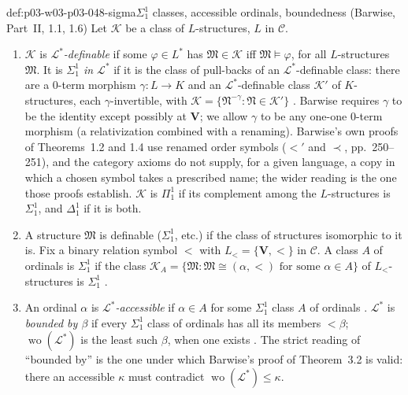 \begin{hbdefinition}{def:p03-w03-p03-048-sigma}{\(\Sigma^1_1\) classes, accessible ordinals, boundedness (Barwise, Part~II, 1.1, 1.6)}
Let \(\mathcal K\) be a class of \(L\)-structures, \(L\) in \(\mathcal C\).
\begin{enumerate}
\item \(\mathcal K\) is \emph{\(\mathcal L^{\ast}\)-definable} if some
      \(\varphi\in L^{\ast}\) has \(\mathfrak M\in\mathcal K\) iff
      \(\mathfrak M\models\varphi\), for all \(L\)-structures \(\mathfrak M\).
      It is \emph{\(\Sigma^1_1\) in \(\mathcal L^{\ast}\)} if it is the class
      of pull-backs of an \(\mathcal L^{\ast}\)-definable class: there are a
      \(0\)-term morphism \(\gamma:L\to K\) and an
      \(\mathcal L^{\ast}\)-definable class \(\mathcal K'\) of
      \(K\)-structures, each \(\gamma\)-invertible, with
      \(\mathcal K=\{\mathfrak N^{-\gamma}:\mathfrak N\in\mathcal K'\}\)
      \cite[Part~II, \S1, 1.1, pp.~248--249]{Barwise1974Axioms}.
      Barwise requires \(\gamma\) to be the identity except possibly at
      \(\mathbf V\); we allow \(\gamma\) to be any one-one \(0\)-term
      morphism (a relativization combined with a renaming).  Barwise's own
      proofs of Theorems~1.2 and 1.4 use renamed order symbols (\(<'\) and
      \(\prec\), pp.~250--251), and the category axioms do not supply, for
      a given language, a copy in which a chosen symbol takes a prescribed
      name; the wider reading is the one those proofs establish.
      \(\mathcal K\) is \(\Pi^1_1\) if its complement among the
      \(L\)-structures is \(\Sigma^1_1\), and \(\Delta^1_1\) if it is both.
\item A structure \(\mathfrak M\) is definable (\(\Sigma^1_1\), etc.) if
      the class of structures isomorphic to it is.  Fix a binary relation
      symbol \(<\) with \(L_{<}=\{\mathbf V,<\}\) in \(\mathcal C\).  A class
      \(A\) of ordinals is \(\Sigma^1_1\) if the class
      \(\mathcal K_A=\{\mathfrak M:\mathfrak M\cong(\alpha,<)\text{ for some
      }\alpha\in A\}\) of \(L_{<}\)-structures is \(\Sigma^1_1\)
      \cite[1.1(ii)--(iii), p.~249]{Barwise1974Axioms}.
\item An ordinal \(\alpha\) is \emph{\(\mathcal L^{\ast}\)-accessible} if
      \(\alpha\in A\) for some \(\Sigma^1_1\) class \(A\) of ordinals
      \cite[p.~250]{Barwise1974Axioms}.  \(\mathcal L^{\ast}\) is
      \emph{bounded by \(\beta\)} if every \(\Sigma^1_1\) class of ordinals
      has all its members \(<\beta\); \(\operatorname{wo}(\mathcal L^{\ast})\)
      is the least such \(\beta\), when one exists \cite[p.~252,
      1.6]{Barwise1974Axioms}.  The strict reading of ``bounded by'' is the
      one under which Barwise's proof of Theorem~3.2 is valid: there an
      accessible \(\kappa\) must contradict
      \(\operatorname{wo}(\mathcal L^{\ast})\leq\kappa\).
\end{enumerate}
\end{hbdefinition}

